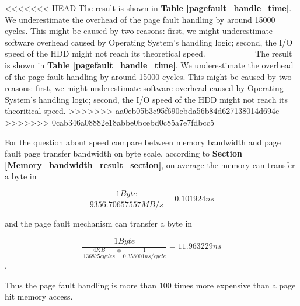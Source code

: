 <<<<<<< HEAD
The result is shown in \textbf{Table \ref{pagefault_handle_time}}. We underestimate the overhead of the page fault handling by around 15000 cycles. This might be caused by two reasons: first, we might underestimate software overhead caused by Operating System's handling logic; second, the I/O speed of the HDD might not reach its theoretical speed.
=======
The result is shown in \textbf{Table \ref{pagefault_handle_time}}. We underestimate the overhead of the page fault handling by around 15000 cycles. This might be caused by two reasons: first, we might underestimate software overhead caused by Operating System's handling logic; second, the I/O speed of the HDD might not reach its theoritical speed.
>>>>>>> aa0eb05b3c95f690ebda56b84d627138014d694c
>>>>>>> 0cab346a08882e18abbe0bcebd0c85a7e7fdbcc5

For the question about speed compare between memory bandwidth and page fault page transfer bandwidth on byte scale, according to \textbf{Section \ref{Memory_bandwidth_result_section}}, on average the memory can transfer a byte in

$$\frac{1 Byte}{9356.70657557 MB/s} = 0.101924 ns $$

and the page fault mechanism can transfer a byte in

$$\frac{1 Byte}{\frac{4 KB}{136875 cycles} * \frac{1}{0.358001 ns/cycle}} = 11.963229 ns $$.

Thus the page fault handling is more than 100 times more expensive than a page hit memory access.
